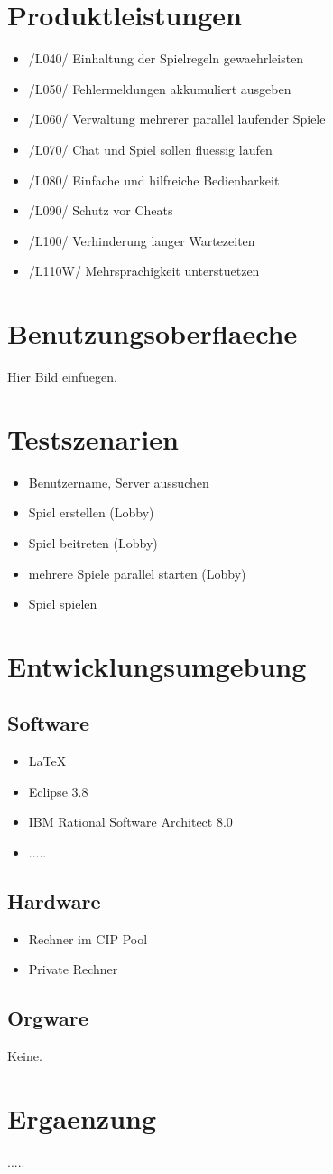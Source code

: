 \documentclass{article}
\begin{document}
\section{Produktleistungen}
\begin{itemize}
	\item /L040/ Einhaltung der Spielregeln gewaehrleisten
	\item /L050/ Fehlermeldungen \gls{akkumuliert} ausgeben
	\item /L060/ Verwaltung mehrerer parallel laufender Spiele
	\item /L070/ Chat und Spiel sollen fluessig laufen
	\item /L080/ Einfache und hilfreiche Bedienbarkeit
	\item /L090/ Schutz vor Cheats
	\item /L100/ Verhinderung langer Wartezeiten
	\item /L110W/ Mehrsprachigkeit unterstuetzen
\end{itemize}

\section{Benutzungsoberflaeche}
Hier Bild einfuegen.

\section{Testszenarien}
\begin{itemize}
	\item Benutzername, Server aussuchen
	\item Spiel erstellen (Lobby)
	\item Spiel beitreten (Lobby)
	\item mehrere Spiele parallel starten (Lobby)
	\item Spiel spielen 
\end{itemize}

\section{Entwicklungsumgebung}
\subsection{Software}
\begin{itemize}
	\item LaTeX
	\item Eclipse 3.8
	\item IBM Rational Software Architect 8.0
	\item .....
\end{itemize}

\subsection{Hardware}
\begin{itemize}
	\item Rechner im CIP Pool	
	\item Private Rechner
\end{itemize}

\subsection{Orgware}
Keine.

\section{Ergaenzung}
..... 
\newpage
\printglossaries
\end{document}
